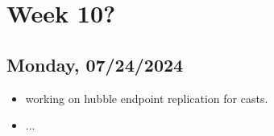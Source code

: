 \newpage
\section{Week 10?}
\subsection*{Monday, 07/24/2024}
\begin{itemize}
    \item working on hubble endpoint replication for casts. 
    \item ...
\end{itemize}
